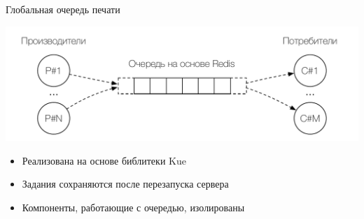 \documentclass[utf-8]{beamer}
\begin{document}
\begin{frame}{Глобальная очередь печати}
  \begin{center}
    \includegraphics[scale=0.5]{producer-consumer-simple.pdf}
  \end{center}

  \begin{itemize}
    \item Реализована на основе библитеки Kue
    \item Задания сохраняются после перезапуска сервера
    \item Компоненты, работающие с очередью, изолированы
  \end{itemize}
\end{frame}
\end{document}
